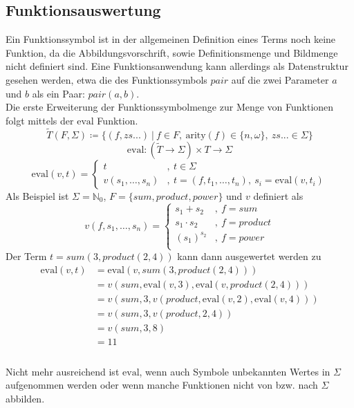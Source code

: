 \documentclass{article}
\begin{document}
\subsection{Funktionsauswertung}
Ein Funktionssymbol ist in der allgemeinen Definition eines Terms noch keine Funktion, da die Abbildungsvorschrift, sowie Definitionsmenge und Bildmenge nicht definiert sind. Eine Funktionsanwendung kann allerdings als Datenstruktur gesehen werden, etwa die des Funktionssymbols $pair$ auf die zwei Parameter $a$ und $b$ als ein Paar: $pair(a, b)$.\\
Die erste Erweiterung der Funktionssymbolmenge zur Menge von Funktionen folgt mittels der $\mathrm{eval}$ Funktion.
$$\tilde{T}(F, \Sigma) \coloneqq \{
(f, zs...)
~|
~f \in F,
~\mathrm{arity}(f) \in \{n, \omega\},
~zs... \in \Sigma
\}$$
$$\mathrm{eval} \colon (\tilde{T} \rightarrow \Sigma) \times T \rightarrow \Sigma$$
$$\mathrm{eval}(v, t) = \begin{cases} 
            t &,~ t\in \Sigma \\
            v(s_1, \dots, s_n) &,~ t = (f, t_1, \dots , t_n), ~s_i = \mathrm{eval}(v, t_i)
            \end{cases}$$
Als Beispiel ist $\Sigma = \mathbb{N}_0$, $F = \{sum, product, power\}$ und $v$ definiert als
$$v(f, s_1, \dots, s_n) = \begin{cases}
s_1 + s_2 &,~ f = sum\\
s_1 \cdot s_2 &,~ f = product\\
(s_1)^{s_2} &,~ f = power\\
\end{cases}$$
Der Term $t = sum(3, product(2, 4))$ kann dann ausgewertet werden zu 
\begin{equation}
    \begin{split}
    \mathrm{eval}(v, t) &= \mathrm{eval}(v, sum(3, product(2, 4))) \\
    &= v(sum, \mathrm{eval}(v, 3), \mathrm{eval}(v, product(2, 4))) \\
    &= v(sum, 3, v(product, \mathrm{eval}(v, 2), \mathrm{eval}(v, 4))) \\
    &= v(sum, 3, v(product, 2, 4)) \\
    &= v(sum, 3, 8) \\
    &= 11 \\
    \end{split}
\end{equation}
\\
Nicht mehr ausreichend ist $\mathrm{eval}$, wenn auch Symbole unbekannten Wertes in $\Sigma$ aufgenommen werden oder wenn manche Funktionen nicht von bzw. nach $\Sigma$ abbilden. 
\end{document}
